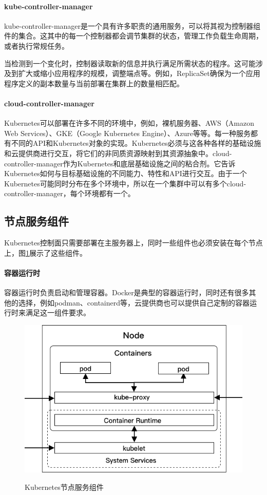 \documentclass[macfonts,master]{njuthesis}
\begin{document}
\paragraph{kube-controller-manager}
kube-controller-manager是一个具有许多职责的通用服务，可以将其视为控制器组件的集合。这其中的每一个控制器都会调节集群的状态，管理工作负载生命周期，或者执行常规任务\cite{gorillaguide}。

当检测到一个变化时，控制器读取新的信息并执行满足所需状态的程序。这可能涉及到扩大或缩小应用程序的规模，调整端点等。例如，ReplicaSet确保为一个应用程序定义的副本数量与当前部署在集群上的数量相匹配。

\paragraph{cloud-controller-manager}
Kubernetes可以部署在许多不同的环境中，例如，裸机服务器、AWS（Amazon Web Services）、GKE（Google Kubernetes Engine）、Azure等等。每一种服务都有不同的API和Kubernetes对象的实现。Kubernetes必须与这各种各样的基础设施和云提供商进行交互，将它们的非同质资源映射到其资源抽象中。cloud-controller-manager作为Kubernetes和底层基础设施之间的粘合剂。它告诉Kubernetes如何与目标基础设施的不同能力、特性和API进行交互。由于一个Kubernetes可能同时分布在多个环境中，所以在一个集群中可以有多个cloud-controller-manager，每个环境都有一个。

\subsection{节点服务组件}
Kubernetes控制面只需要部署在主服务器上，同时一些组件也必须安装在每个节点上，图\ref{fig:k8s-node}展示了这些组件。

\paragraph{容器运行时}
容器运行时负责启动和管理容器。Docker是典型的容器运行时，同时还有很多其他的选择，例如podman、containerd等，云提供商也可以提供自己定制的容器运行时来满足这一组件要求。

\begin{figure}[htbp]
  \centering
  \includegraphics[width= 1\textwidth]{pics/K8s-node-server-components.png}\\
  \caption{Kubernetes节点服务组件\cite{gorillaguide}}\label{fig:k8s-node}
\end{figure}
\end{document}
